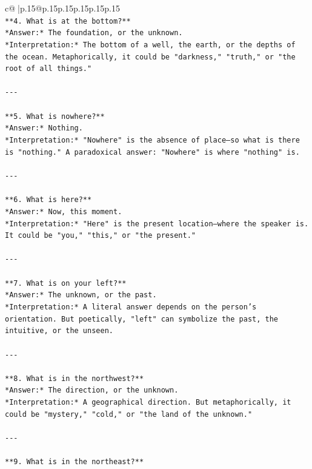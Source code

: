 \documentclass{article}
\begin{document}
{\begin{supertabular}{c@{$\;$}|p{.15\linewidth}@{}p{.15\linewidth}p{.15\linewidth}p{.15\linewidth}p{.15\linewidth}p{.15\linewidth}}
{{{\\ 
\texttt{**4. What is at the bottom?**  } \\
\texttt{*Answer:* The foundation, or the unknown.  } \\
\texttt{*Interpretation:* The bottom of a well, the earth, or the depths of the ocean. Metaphorically, it could be "darkness," "truth," or "the root of all things."} \\
\\ 
\texttt{{-}{-}{-}} \\
\\ 
\texttt{**5. What is nowhere?**  } \\
\texttt{*Answer:* Nothing.  } \\
\texttt{*Interpretation:* "Nowhere" is the absence of place—so what is there is "nothing." A paradoxical answer: "Nowhere" is where "nothing" is.} \\
\\ 
\texttt{{-}{-}{-}} \\
\\ 
\texttt{**6. What is here?**  } \\
\texttt{*Answer:* Now, this moment.  } \\
\texttt{*Interpretation:* "Here" is the present location—where the speaker is. It could be "you," "this," or "the present."} \\
\\ 
\texttt{{-}{-}{-}} \\
\\ 
\texttt{**7. What is on your left?**  } \\
\texttt{*Answer:* The unknown, or the past.  } \\
\texttt{*Interpretation:* A literal answer depends on the person’s orientation. But poetically, "left" can symbolize the past, the intuitive, or the unseen.} \\
\\ 
\texttt{{-}{-}{-}} \\
\\ 
\texttt{**8. What is in the northwest?**  } \\
\texttt{*Answer:* The direction, or the unknown.  } \\
\texttt{*Interpretation:* A geographical direction. But metaphorically, it could be "mystery," "cold," or "the land of the unknown."} \\
\\ 
\texttt{{-}{-}{-}} \\
\\ 
\texttt{**9. What is in the northeast?**  } \\
}}}
\end{supertabular}}
\end{document}
